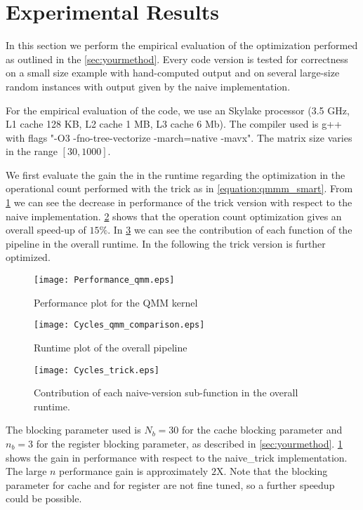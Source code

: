 \section{Experimental Results}\label{sec:exp}
\graphicspath{{../../plots/}}

In this section we perform the empirical evaluation of the optimization performed as outlined in the \cref{sec:yourmethod}. Every code version is tested for correctness on a small size example with hand-computed output and on several large-size random instances with output given by the naive implementation.

For the empirical evaluation of the code, we use an Skylake processor (3.5 GHz, L1 cache 128 KB, L2 cache 1 MB, L3 cache 6 Mb). The compiler used is g++ with flags "-O3 -fno-tree-vectorize -march=native -mavx". The matrix size varies in the range $[30,1000]$.

We first evaluate the gain the in the runtime regarding the optimization in the operational count performed with the trick as in \cref{equation:qmmm_smart}. From \cref{figure:performance_qmm_kernel} we can see the decrease in performance of the trick version with respect to the naive implementation. \cref{figure:cycles_qmm_comparison} shows that the operation count optimization gives an overall speed-up of $15 \%$. In \cref{figure:Cycles_trick} we can see the contribution of each function of the pipeline in the overall runtime. In the following the trick version is further optimized.

\begin{figure}[h]
\texttt{[image: Performance\_qmm.eps]}
\caption{Performance plot for the QMM kernel}
\label{figure:performance_qmm_kernel}
\end{figure}

\begin{figure}[h]
\texttt{[image: Cycles\_qmm\_comparison.eps]}
\caption{Runtime plot of the overall pipeline}
\label{figure:cycles_qmm_comparison}
\end{figure}

\begin{figure}[h]
\texttt{[image: Cycles\_trick.eps]}
\caption{Contribution of each naive-version sub-function in the overall runtime.} 
\label{figure:Cycles_trick}
\end{figure}


The blocking parameter used is $N_b = 30$ for the cache blocking parameter and $n_b = 3$ for the register blocking parameter, as described in \cref{sec:yourmethod}. \cref{figure:performance_qmm_kernel} shows the gain in performance with respect to the naive\_trick implementation. The large $n$ performance gain is approximately $2$X. Note that the blocking parameter for cache and for register are not fine tuned, so a further speedup could be possible.



